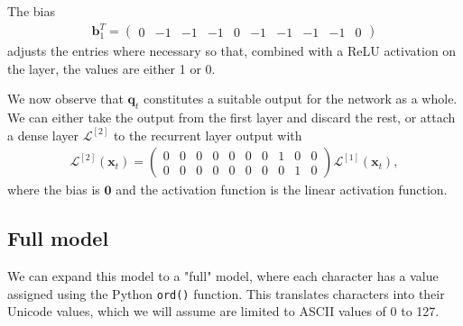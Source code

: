 \documentclass{somasmsc}
\begin{document}
The bias 
\begin{align}
\pmb{b}_1^T =
\begin{pmatrix}
0 & -1 & -1 & -1 & 0 & -1 & -1 & -1 & -1 & 0
\end{pmatrix}
\end{align}
adjusts the entries where necessary so that, combined with a ReLU activation on the layer, the values are either 1 or 0.

We now observe that $\pmb{q}_t$ constitutes a suitable output for the network as a whole. We can either take the output from the first layer and discard the rest, or attach a dense layer $\mathcal{L}^{\left[2\right]}$ to the recurrent layer output with
\begin{align}
\mathcal{L}^{\left[2\right]}\left(\pmb{x}_t\right) =
\begin{pmatrix}
    0 & 0 & 0 & 0 & 0 & 0 & 0 & 1 & 0 & 0 \\
    0 & 0 & 0 & 0 & 0 & 0 & 0 & 0 & 1 & 0
\end{pmatrix}
\mathcal{L}^{\left[1\right]}\left(\pmb{x}_t\right),
\end{align}
where the bias is $\mathbf{0}$ and the activation function is the linear activation function.

\subsection{Full model}\label{zeroone:full}

We can expand this model to a "full" model, where each character has a value assigned using the Python \verb|ord()| function. This translates characters into their Unicode values, which we will assume are limited to ASCII values of 0 to 127.
\end{document}

